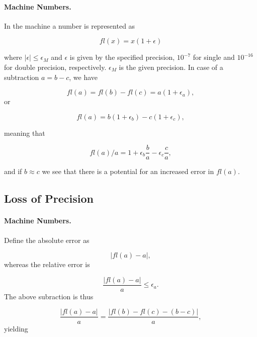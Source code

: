 \documentclass[%
oneside,                 %
final,                   %
10pt]{article}
\begin{document}
{{{{{%
\paragraph{Machine Numbers.}
In the machine a number is represented as

\begin{equation}
  fl(x)= x(1+\epsilon)
\end{equation}

where $|\epsilon| \leq \epsilon_M$ and $\epsilon$ is given by the
specified precision, $10^{-7}$ for single and $10^{-16}$ for double
precision, respectively.
$\epsilon_M$ is the given precision.
In case of a subtraction $a=b-c$, we have

\begin{equation}
   fl(a)=fl(b)-fl(c) = a(1+\epsilon_a),
\end{equation}
or

\begin{equation}
   fl(a)=b(1+\epsilon_b)-c(1+\epsilon_c),
\end{equation}

meaning that

\begin{equation}
   fl(a)/a=1+\epsilon_b\frac{b}{a}- \epsilon_c\frac{c}{a},
\end{equation}

and if $b\approx c$ we see that there is a potential for an increased
error in $fl(a)$.



\subsection{Loss of Precision}


\paragraph{Machine Numbers.}
Define
the absolute error as

\begin{equation}
   |fl(a)-a|,
\end{equation}
whereas the relative error is

\begin{equation}
   \frac{ |fl(a)-a|}{a} \le \epsilon_a.
\end{equation}
The above subraction is thus

\begin{equation}
   \frac{ |fl(a)-a|}{a}=\frac{ |fl(b)-fl(c)-(b-c)|}{a},
\end{equation}
yielding

}}}}}
\end{document}
